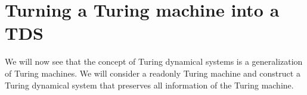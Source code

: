 \section{Turning a Turing machine into a TDS} \label{tm_to_tds}

We will now see that the concept of Turing dynamical systems is a generalization of Turing machines.
We will consider a readonly Turing machine and construct a Turing dynamical system that preserves all information of the Turing machine.





